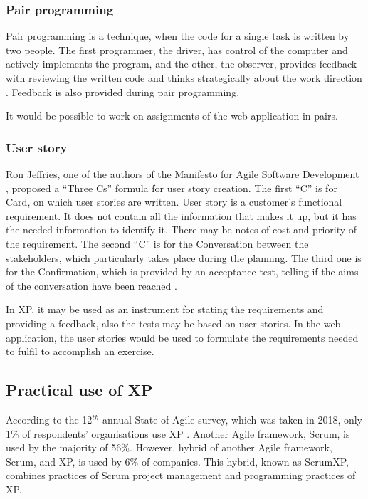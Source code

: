 \subsubsection{Pair programming}
Pair programming is a technique, when the code for a single task is written by two people. The first programmer, the driver, has control of the computer and actively implements the program, and the other, the observer, provides feedback with reviewing the written code and thinks strategically about the work direction \cite{pair_prog}. Feedback is also provided during pair programming. 

It would be possible to work on assignments of the web application in pairs.

\subsubsection{User story}
Ron Jeffries, one of the authors of the Manifesto for Agile Software Development \cite{manifesto}, proposed a ``Three Cs'' formula for user story creation. The first ``C'' is for Card, on which user stories are written. User story is a customer's functional requirement. It does not contain all the information that makes it up, but it has the needed information to identify it. There may be notes of cost and priority of the requirement. The second ``C'' is for the Conversation between the stakeholders, which particularly takes place during the planning. The third one is for the Confirmation, which is provided by an acceptance test, telling if the aims of the conversation have been reached \cite{rj_3c}.

In XP, it may be used as an instrument for stating the requirements and providing a feedback, also the tests may be based on user stories. In the web application, the user stories would be used to formulate the requirements needed to fulfil to accomplish an exercise.

\subsection{Practical use of XP}
According to the 12$^{th}$ annual State of Agile survey, which was taken in 2018, only 1\% of respondents' organisations use XP \cite{agile_survey}. Another Agile framework, Scrum, is used by the majority of 56\%. However, hybrid of another Agile framework, Scrum, and XP, is used by 6\% of companies. This hybrid, known as ScrumXP, combines practices of Scrum project management and programming practices of XP.

